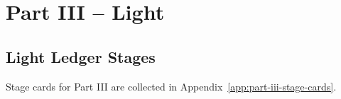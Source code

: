 \part{Part III -- Light}

\chapter{Light Ledger Stages}

Stage cards for Part III are collected in Appendix~\ref{app:part-iii-stage-cards}.
